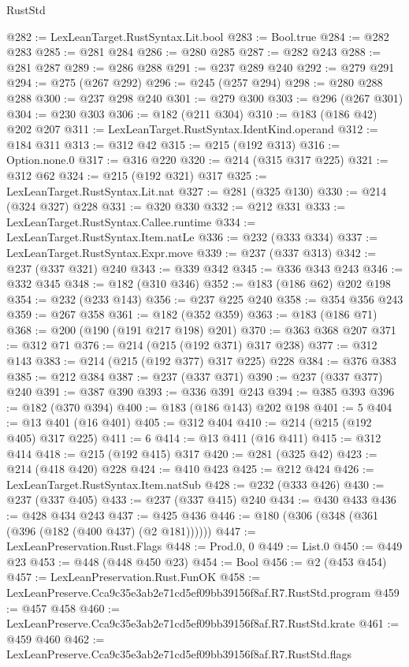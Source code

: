 \begin{lexlean}{RustStd}
\begin{coremodule}
@282 := LexLeanTarget.RustSyntax.Lit.bool
@283 := Bool.true
@284 := @282 @283
@285 := @281 @284
@286 := @280 @285
@287 := @282 @243
@288 := @281 @287
@289 := @286 @288
@291 := @237 @289 @240
@292 := @279 @291
@294 := @275 (@267 @292)
@296 := @245 (@257 @294)
@298 := @280 @288 @288
@300 := @237 @298 @240
@301 := @279 @300
@303 := @296 (@267 @301)
@304 := @230 @303
@306 := @182 (@211 @304)
@310 := @183 (@186 @42) @202 @207
@311 := LexLeanTarget.RustSyntax.IdentKind.operand
@312 := @184 @311
@313 := @312 @42
@315 := @215 (@192 @313)
@316 := Option.none.{0}
@317 := @316 @220
@320 := @214 (@315 @317 @225)
@321 := @312 @62
@324 := @215 (@192 @321) @317
@325 := LexLeanTarget.RustSyntax.Lit.nat
@327 := @281 (@325 @130)
@330 := @214 (@324 @327) @228
@331 := @320 @330
@332 := @212 @331
@333 := LexLeanTarget.RustSyntax.Callee.runtime
@334 := LexLeanTarget.RustSyntax.Item.natLe
@336 := @232 (@333 @334)
@337 := LexLeanTarget.RustSyntax.Expr.move
@339 := @237 (@337 @313)
@342 := @237 (@337 @321) @240
@343 := @339 @342
@345 := @336 @343 @243
@346 := @332 @345
@348 := @182 (@310 @346)
@352 := @183 (@186 @62) @202 @198
@354 := @232 (@233 @143)
@356 := @237 @225 @240
@358 := @354 @356 @243
@359 := @267 @358
@361 := @182 (@352 @359)
@363 := @183 (@186 @71)
@368 := @200 (@190 (@191 @217 @198) @201)
@370 := @363 @368 @207
@371 := @312 @71
@376 := @214 (@215 (@192 @371) @317 @238)
@377 := @312 @143
@383 := @214 (@215 (@192 @377) @317 @225) @228
@384 := @376 @383
@385 := @212 @384
@387 := @237 (@337 @371)
@390 := @237 (@337 @377) @240
@391 := @387 @390
@393 := @336 @391 @243
@394 := @385 @393
@396 := @182 (@370 @394)
@400 := @183 (@186 @143) @202 @198
@401 := 5
@404 := @13 @401 (@16 @401)
@405 := @312 @404
@410 := @214 (@215 (@192 @405) @317 @225)
@411 := 6
@414 := @13 @411 (@16 @411)
@415 := @312 @414
@418 := @215 (@192 @415) @317
@420 := @281 (@325 @42)
@423 := @214 (@418 @420) @228
@424 := @410 @423
@425 := @212 @424
@426 := LexLeanTarget.RustSyntax.Item.natSub
@428 := @232 (@333 @426)
@430 := @237 (@337 @405)
@433 := @237 (@337 @415) @240
@434 := @430 @433
@436 := @428 @434 @243
@437 := @425 @436
@446 := @180 (@306 (@348 (@361 (@396 (@182 (@400 @437) (@2 @181))))))
@447 := LexLeanPreservation.Rust.Flags
@448 := Prod.{0, 0}
@449 := List.{0}
@450 := @449 @23
@453 := @448 (@448 @450 @23)
@454 := Bool
@456 := @2 (@453 @454)
@457 := LexLeanPreservation.Rust.FunOK
@458 := LexLeanPreserve.Cca9c35e3ab2e71cd5ef09bb39156f8af.R7.RustStd.program
@459 := @457 @458
@460 := LexLeanPreserve.Cca9c35e3ab2e71cd5ef09bb39156f8af.R7.RustStd.krate
@461 := @459 @460
@462 := LexLeanPreserve.Cca9c35e3ab2e71cd5ef09bb39156f8af.R7.RustStd.flags

\end{coremodule}
\end{lexlean}

